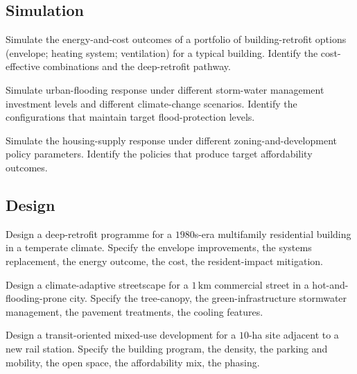 \subsection*{Simulation}

\begin{exercise}
Simulate the energy-and-cost outcomes of a portfolio of building-retrofit options (envelope; heating system; ventilation) for a typical building. Identify the cost-effective combinations and the deep-retrofit pathway.
\end{exercise}

\begin{exercise}
Simulate urban-flooding response under different storm-water management investment levels and different climate-change scenarios. Identify the configurations that maintain target flood-protection levels.
\end{exercise}

\begin{exercise}
Simulate the housing-supply response under different zoning-and-development policy parameters. Identify the policies that produce target affordability outcomes.
\end{exercise}

\subsection*{Design}

\begin{exercise}
Design a deep-retrofit programme for a $1980$s-era multifamily residential building in a temperate climate. Specify the envelope improvements, the systems replacement, the energy outcome, the cost, the resident-impact mitigation.
\end{exercise}

\begin{exercise}
Design a climate-adaptive streetscape for a $1\,\text{km}$ commercial street in a hot-and-flooding-prone city. Specify the tree-canopy, the green-infrastructure stormwater management, the pavement treatments, the cooling features.
\end{exercise}

\begin{exercise}
Design a transit-oriented mixed-use development for a $10$-ha site adjacent to a new rail station. Specify the building program, the density, the parking and mobility, the open space, the affordability mix, the phasing.
\end{exercise}

